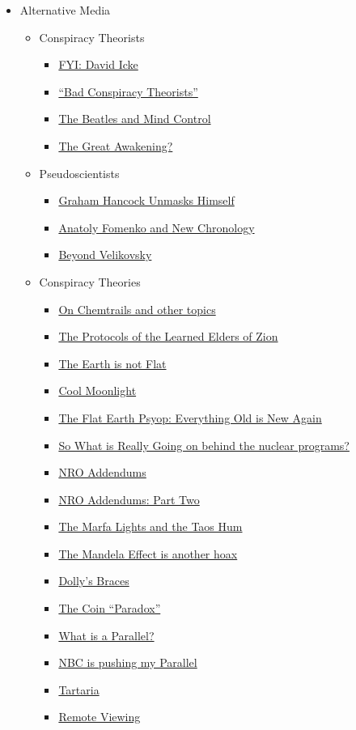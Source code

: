 \documentclass{article}
\newcommand{\insertmydocument}[2]{ %
  \item \href{http://www.mileswmathis.com/#2}{#1}
}
\begin{document}
\begin{itemize}
  \item Alternative Media
  \begin{itemize}

    \item Conspiracy Theorists
    \begin{itemize}

      \insertmydocument{FYI: David Icke}{icke.pdf}
      \insertmydocument{“Bad Conspiracy Theorists”}{curio.pdf}
      \insertmydocument{The Beatles and Mind Control}{weidner.pdf}
      \insertmydocument{The Great Awakening?}{awake.pdf}

    \end{itemize}

    \item Pseudoscientists
    \begin{itemize}

      \insertmydocument{Graham Hancock Unmasks Himself}{hanco.pdf}
      \insertmydocument{Anatoly Fomenko and New Chronology}{newchron.pdf}
      \insertmydocument{Beyond Velikovsky}{vel2.pdf}
    \end{itemize}

    \item Conspiracy Theories
    \begin{itemize}

      \insertmydocument{On Chemtrails and other topics}{chem2.pdf}
      \insertmydocument{The Protocols of the Learned Elders of Zion}{protocols.pdf}
      \insertmydocument{The Earth is not Flat}{flatearth.pdf}
      \insertmydocument{Cool Moonlight}{mooncool.pdf}
      \insertmydocument{The Flat Earth Psyop: Everything Old is New Again}{flat.pdf}
      \insertmydocument{So What is Really Going on behind the nuclear programs?}{caes.pdf}
      \insertmydocument{NRO Addendums}{nro.pdf}
      \insertmydocument{NRO Addendums: Part Two}{NRO2.pdf}
      \insertmydocument{The Marfa Lights and the Taos Hum}{marfa.pdf}
      \insertmydocument{The Mandela Effect is another hoax}{mandela.pdf}
      \insertmydocument{Dolly's Braces}{mandela3.pdf}
      \insertmydocument{The Coin “Paradox”}{coin.pdf}
      \insertmydocument{What is a Parallel?}{lafrance.pdf}
      \insertmydocument{NBC is pushing my Parallel}{lively.pdf}
      \insertmydocument{Tartaria}{tartar.pdf}
      \insertmydocument{Remote Viewing}{remote.pdf}
    \end{itemize}
  \end{itemize}
\end{itemize}
\end{document}
